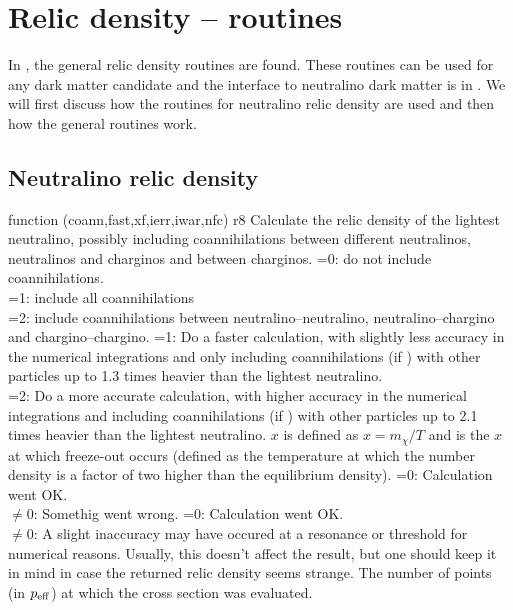 \section{Relic density -- routines}

In , the general relic density routines are found. These
routines can be used for any dark matter candidate and the interface
to neutralino dark matter is in . We will first discuss how
the routines for neutralino relic density are used and then how the
general routines work.

\subsection{Neutralino relic density}

\begin{sub}{function (coann,fast,xf,ierr,iwar,nfc)
\hfill r8}
   Calculate the relic density of the lightest
  neutralino, possibly including coannihilations between different
  neutralinos, neutralinos and charginos and between charginos.
  =0: do not include coannihilations. \\
  =1: include all coannihilations \\
  =2: include coannihilations between
    neutralino--neutralino, neutralino--chargino and
    chargino--chargino.
  =1: Do a faster calculation, with slightly less accuracy in the
  numerical integrations and only including coannihilations (if
  ) with other particles up to 1.3 times heavier than the
  lightest neutralino.\\
  =2: Do a more accurate calculation, with higher accuracy in the
  numerical integrations and including coannihilations (if
  ) with other particles up to 2.1 times heavier than the
  lightest neutralino.
   $x$ is defined as $x=m_\chi/T$ and  is the $x$
  at which freeze-out occurs (defined as the temperature at which the
  number density is a factor of two higher than the equilibrium
  density). 
   =0: Calculation went OK.\\
  $\neq0$: Somethig went wrong. 
   =0: Calculation went OK.\\
  $\neq0$: A slight inaccuracy may have occured at a resonance or
  threshold for numerical reasons. Usually, this doesn't affect the
  result, but one should keep it in mind in case the returned relic
  density seems strange.
   The number of points (in $p_{\rm eff}$) at which the
  cross section was evaluated.
\end{sub}

